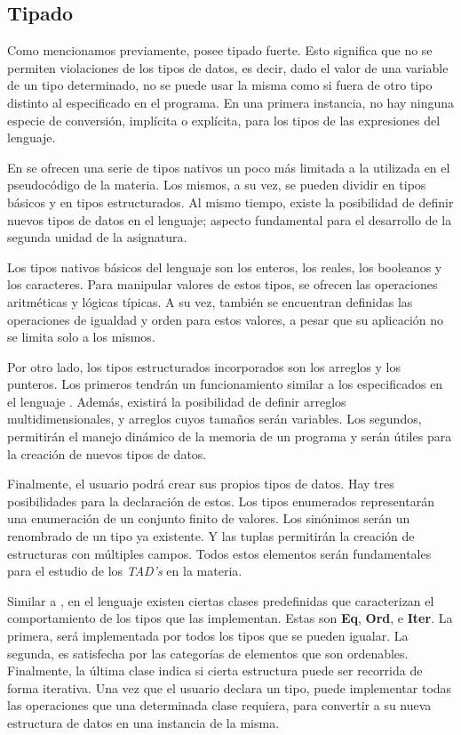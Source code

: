 \subsection{Tipado}

Como mencionamos previamente, \Lenguaje{} posee tipado fuerte.
Esto significa que no se permiten violaciones de los tipos de datos, es decir, dado el valor de una variable de un tipo determinado, no se puede usar la misma como si fuera de otro tipo distinto al especificado en el programa.
En una primera instancia, no hay ninguna especie de conversión, implícita o explícita, para los tipos de las expresiones del lenguaje.

En \Lenguaje{} se ofrecen una serie de tipos nativos un poco más limitada a la utilizada en el pseudocódigo de la materia.
Los mismos, a su vez, se pueden dividir en tipos básicos y en tipos estructurados.
Al mismo tiempo, existe la posibilidad de definir nuevos tipos de datos en el lenguaje; aspecto fundamental para el desarrollo de la segunda unidad de la asignatura.

Los tipos nativos básicos del lenguaje son los enteros, los reales, los booleanos y los caracteres.
Para manipular valores de estos tipos, se ofrecen las operaciones aritméticas y lógicas típicas.
A su vez, también se encuentran definidas las operaciones de igualdad y orden para estos valores, a pesar que su aplicación no se limita solo a los mismos.

Por otro lado, los tipos estructurados incorporados son los arreglos y los punteros.
Los primeros tendrán un funcionamiento similar a los especificados en el lenguaje \C{}.
Además, existirá la posibilidad de definir arreglos multidimensionales, y arreglos cuyos tamaños serán variables.
Los segundos, permitirán el manejo dinámico de la memoria de un programa y serán útiles para la creación de nuevos tipos de datos.

Finalmente, el usuario podrá crear sus propios tipos de datos.
Hay tres posibilidades para la declaración de estos.
Los tipos enumerados representarán una enumeración de un conjunto finito de valores.
Los sinónimos serán un renombrado de un tipo ya existente.
Y las tuplas permitirán la creación de estructuras con múltiples campos.
Todos estos elementos serán fundamentales para el estudio de los \textit{TAD's} en la materia.

Similar a \Haskell{}, en el lenguaje existen ciertas clases predefinidas que caracterizan el comportamiento de los tipos que las implementan.
Estas son \textbf{Eq}, \textbf{Ord}, e \textbf{Iter}.
La primera, será implementada por todos los tipos que se pueden igualar.
La segunda, es satisfecha por las categorías de elementos que son ordenables.
Finalmente, la última clase indica si cierta estructura puede ser recorrida de forma iterativa.
Una vez que el usuario declara un tipo, puede implementar todas las operaciones que una determinada clase requiera, para convertir a su nueva estructura de datos en una instancia de la misma.

